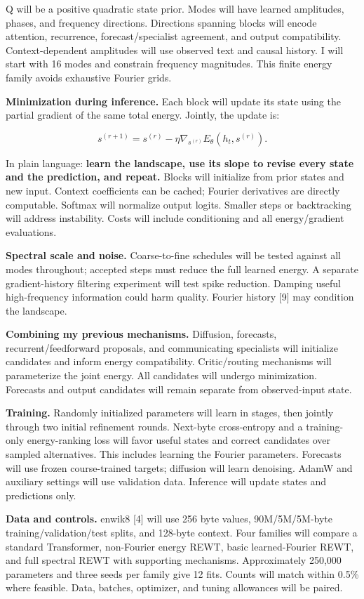 \documentclass[11pt,letterpaper]{article}
\begin{document}
Q will be a positive quadratic state prior. Modes will have learned amplitudes, phases, and frequency directions. Directions spanning blocks will encode attention, recurrence, forecast/specialist agreement, and output compatibility. Context-dependent amplitudes will use observed text and causal history. I will start with 16 modes and constrain frequency magnitudes. This finite energy family avoids exhaustive Fourier grids.

\textbf{Minimization during inference.} Each block will update its state using the partial gradient of the same total energy. Jointly, the update is:

\[
s^{(r+1)}=s^{(r)}-\eta\nabla_{s^{(r)}}E_\theta(h_t,s^{(r)}).
\]

In plain language: \textbf{learn the landscape, use its slope to revise every state and the prediction, and repeat.} Blocks will initialize from prior states and new input. Context coefficients can be cached; Fourier derivatives are directly computable. Softmax will normalize output logits. Smaller steps or backtracking will address instability. Costs will include conditioning and all energy/gradient evaluations.

\textbf{Spectral scale and noise.} Coarse-to-fine schedules will be tested against all modes throughout; accepted steps must reduce the full learned energy. A separate gradient-history filtering experiment will test spike reduction. Damping useful high-frequency information could harm quality. Fourier history [9] may condition the landscape.

\textbf{Combining my previous mechanisms.} Diffusion, forecasts, recurrent/feedforward proposals, and communicating specialists will initialize candidates and inform energy compatibility. Critic/routing mechanisms will parameterize the joint energy. All candidates will undergo minimization. Forecasts and output candidates will remain separate from observed-input state.

\textbf{Training.} Randomly initialized parameters will learn in stages, then jointly through two initial refinement rounds. Next-byte cross-entropy and a training-only energy-ranking loss will favor useful states and correct candidates over sampled alternatives. This includes learning the Fourier parameters. Forecasts will use frozen course-trained targets; diffusion will learn denoising. AdamW and auxiliary settings will use validation data. Inference will update states and predictions only.

\textbf{Data and controls.} enwik8 [4] will use 256 byte values, 90M/5M/5M-byte training/validation/test splits, and 128-byte context. Four families will compare a standard Transformer, non-Fourier energy REWT, basic learned-Fourier REWT, and full spectral REWT with supporting mechanisms. Approximately 250,000 parameters and three seeds per family give 12 fits. Counts will match within 0.5\% where feasible. Data, batches, optimizer, and tuning allowances will be paired.
\end{document}

